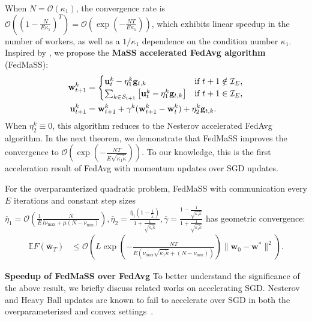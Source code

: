 When $N=\mathcal{O}(\kappa_{1})$, the convergence rate is $\mathcal{O}((1-\frac{N}{E\kappa_{1}})^{T})=\mathcal{O}(\exp(-\frac{NT}{E\kappa_{1}}))$,
which exhibits linear speedup in the number of workers, as well as
a $1/\kappa_{1}$ dependence on the condition number $\kappa_{1}$.
Inspired by \cite{liu2018accelerating}, we propose the \textbf{MaSS
	accelerated FedAvg algorithm} (FedMaSS):
\begin{align*}
\mathbf{w}_{t+1}^{k} & =\begin{cases}
\mathbf{u}_{t}^{k}-\eta_{1}^{k}\mathbf{g}_{t,k} & \text{if }t+1\notin\mathcal{I}_{E},\\
\sum_{k \in {\mathcal{S}}_{t+1}}\left[\mathbf{u}_{t}^{k}-\eta_{1}^{k}\mathbf{g}_{t,k}\right] & \text{if }t+1\in\mathcal{I}_{E},
\end{cases}\\
\mathbf{u}_{t+1}^{k} & =\mathbf{w}_{t+1}^{k}+\gamma^{k}(\mathbf{w}_{t+1}^{k}-\mathbf{w}_{t}^{k})+\eta_{2}^{k}\mathbf{g}_{t,k}. 
\end{align*}
When $\eta_{2}^{k}\equiv0$, this algorithm reduces to the Nesterov
accelerated FedAvg algorithm. In the next theorem, we demonstrate
that FedMaSS improves the convergence to $\mathcal{O}(\exp(-\frac{NT}{E\sqrt{\kappa_{1}\tilde{\kappa}}}))$.
To our knowledge, this is the first acceleration result of
FedAvg with momentum updates over SGD updates.
\begin{theorem}
	\label{thm:overparameterized_MaSS}For the overparamterized quadratic
	problem, FedMaSS with communication every $E$ iterations and constant
	step sizes $\overline{\eta}_1=\mathcal{O}(\frac{1}{E}\frac{N}{l\nu_{\max}+\mu(N-\nu_{\min})}),\overline{\eta}_{2}=\frac{\overline{\eta}_{1}(1-\frac{1}{\tilde{\kappa}})}{1+\frac{1}{\sqrt{\kappa_{1}\tilde{\kappa}}}},\overline{\gamma}=\frac{1-\frac{1}{\sqrt{\kappa_{1}\tilde{\kappa}}}}{1+\frac{1}{\sqrt{\kappa_{1}\tilde{\kappa}}}}$
	has geometric convergence:
	\begin{align*}
	\mathbb{E}F(\overline{\mathbf{w}}_{T}) & \leq\mathcal{O}\left(L\exp(-\frac{NT}{E(\nu_{\max}\sqrt{\kappa_{1}\tilde{\kappa}}+(N-\nu_{\min}))})\|\mathbf{w}_{0}-\mathbf{w}^{\ast}\|^{2}\right).
	\end{align*}
\end{theorem}
\textbf{Speedup of FedMaSS over FedAvg} 
To better understand the significance of the above result, we briefly discuss related works on accelerating SGD.
Nesterov and Heavy Ball updates are known to fail to accelerate over SGD in both the overparameterized
and convex settings~\cite{liu2018accelerating,kidambi2018insufficiency,liu2018toward,yuan2016influence}.
